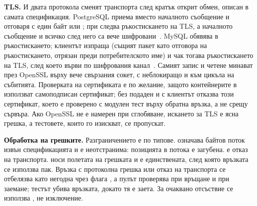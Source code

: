 \textbf{TLS.} И двата протокола сменят транспорта след кратък открит обмен, описан в самата
спецификация. PostgreSQL приема  вместо началното съобщение и отговаря с един
байт  или ; при  следва ръкостискането на TLS, а началното съобщение и
всичко след него са вече шифровани~\cite{pg_protocol}. MySQL обявява  в
ръкостискането; клиентът изпраща  (същият пакет като отговора на ръкостискането,
отрязан преди потребителското име) и чак тогава ръкостискането на TLS, след което
 върви по шифрования канал~\cite{mysql_protocol}. Самият запис и четене
минават през OpenSSL върху вече свързания сокет, с неблокиращо  и
 към цикъла на събитията. Проверката на сертификата е по желание,
защото контейнерите в  използват самоподписан сертификат; без подаден
 и с  клиентът отказва този сертификат, което е проверено с
модулен тест върху обратна връзка, а не срещу сървъра. Ако OpenSSL не е намерен при сглобяване,
искането за TLS е ясна грешка, а тестовете, които го изискват, се пропускат.

\textbf{Обработка на грешките.} Разграничението е по типове.  означава
байтов поток извън спецификацията и е неотстранима: позицията в потока е загубена.
 е отказ на транспорта.  носи полетата на грешката и е
единствената, след която връзката се използва пак. Връзка с протоколна грешка или отказ на
транспорта се отбелязва като негодна чрез флага , а пулът проверява
 при връщане и при заемане; тестът
 убива връзката,
докато тя е заета. За очаквано отсъствие се използва , не изключение.
